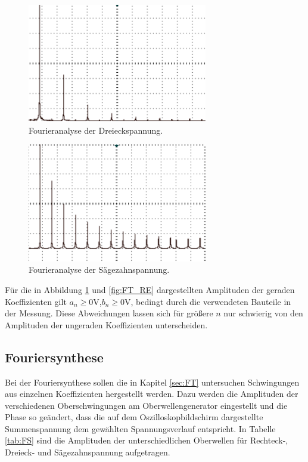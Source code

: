 \begin{figure}
	\centering
		\includegraphics[width=0.7\textwidth]{Bilder/FT_DE2.pdf}		
\caption{Fourieranalyse der Dreieckspannung.}
	\label{fig:FT_DE}
\end{figure}


\begin{figure}
	\centering
		\includegraphics[width=0.7\textwidth]{Bilder/FT_SZ.pdf}		
\caption{Fourieranalyse der Sägezahnspannung.}
	\label{fig:FT_SZ}
\end{figure}
 Für die in Abbildung \ref{fig:FT_DE} und \ref{fig:FT_RE} dargestellten Amplituden der geraden Koeffizienten gilt $a_n\geqslant0\si\volt$,$b_n\geqslant0\si\volt$, bedingt durch die verwendeten Bauteile in der Messung. Diese Abweichungen lassen sich für größere $n$ nur schwierig von den Amplituden der ungeraden Koeffizienten unterscheiden.

















\subsection{Fouriersynthese}
Bei der Fouriersynthese sollen die in Kapitel \ref{sec:FT} untersuchen Schwingungen aus einzelnen Koeffizienten hergestellt werden. Dazu werden die Amplituden der verschiedenen Oberschwingungen am Oberwellengenerator eingestellt und die Phase so geändert, dass die auf dem Oszilloskopbildschirm dargestellte Summenspannung dem gewählten Spannungsverlauf entspricht. In Tabelle \ref{tab:FS} sind die Amplituden der unterschiedlichen Oberwellen für Rechteck-, Dreieck- und Sägezahnspannung aufgetragen.

